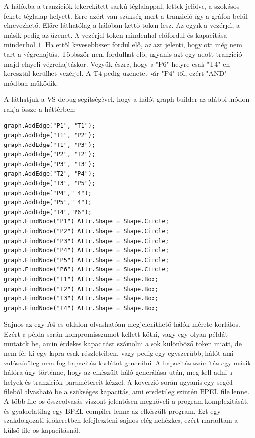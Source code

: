 A hálókba a tranziciók lekerekített sarkú téglalappal, lettek jelölve, a szokásos fekete téglalap helyett. Erre azért van szükség mert a tranzició így a gráfon belül elnevezhető. Előre láthatólag a hálóban kettő token lesz. Az egyik a vezérjel, a másik pedig az üzenet. A vezérjel token mindenhol előfordul és kapacitása mindenhol $1$. Ha ettől kevesebbszer fordul elő, az azt jelenti, hogy ott még nem tart a végrehajtás. Többször nem fordulhat elő, ugyanis azt egy adott tranzició majd elnyeli végrehajtáskor.
Vegyük észre, hogy a "P6" helyre csak "T4" en keresztül kerülhet vezérjel. A T4 pedig üzenetet vár "P4" től, ezért "AND" módban működik.   

A láthatjuk a VS debug segítségével, hogy a hálót graph-builder az alábbi módon rakja össze a háttérben:
\begin{verbatim}
graph.AddEdge("P1", "T1");
graph.AddEdge("T1", "P2");
graph.AddEdge("T1", "P3");
graph.AddEdge("P2", "T2");
graph.AddEdge("P3", "T3");
graph.AddEdge("T2", "P4");
graph.AddEdge("T3", "P5");
graph.AddEdge("P4","T4");
graph.AddEdge("P5","T4");
graph.AddEdge("T4","P6");
graph.FindNode("P1").Attr.Shape = Shape.Circle;
graph.FindNode("P2").Attr.Shape = Shape.Circle;
graph.FindNode("P3").Attr.Shape = Shape.Circle;
graph.FindNode("P4").Attr.Shape = Shape.Circle;
graph.FindNode("P5").Attr.Shape = Shape.Circle;
graph.FindNode("P6").Attr.Shape = Shape.Circle;
graph.FindNode("T1").Attr.Shape = Shape.Box;
graph.FindNode("T2").Attr.Shape = Shape.Box;
graph.FindNode("T3").Attr.Shape = Shape.Box;
graph.FindNode("T4").Attr.Shape = Shape.Box;
\end{verbatim}

Sajnos az egy A4-es oldalon olvashatóan megjeleníthető hálók mérete korlátos. Ezért a példa során kompromisszumot kellett kötni, vagy egy olyan példát mutatok be, amin érdekes kapacitást számolni a sok különböző token miatt, de nem fér ki egy lapra csak részleteiben, vagy pedig egy egyszerűbb, hálót ami valószínűleg nem fog kapacitás korlátot generálni. 
A kapacitás számítás egy másik hálóra úgy történne, hogy az elkészült háló generálása után, meg kell adni a helyek és tranziciók paramétereit kézzel. A koverzió során ugyanis egy segéd fileból olvasható be a szükséges kapacitás, ami eredetileg szintén BPEL file lenne. A több file-os összeolvasás viszont jelentősen megnöveli a program komplexitását, és gyakorlatilag egy BPEL compiler lenne az elkészült program. Ezt egy szakdolgozati időkeretben lefejleszteni sajnos elég nehézkes, ezért maradtam a külső file-os kapacitásnál. 

